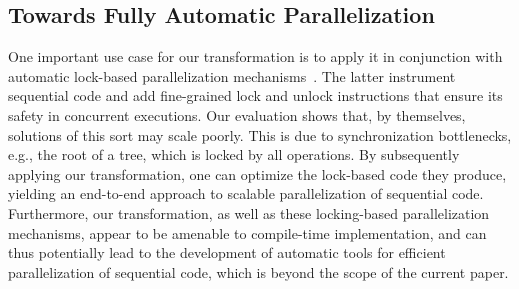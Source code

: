 \subsection{Towards Fully Automatic Parallelization}
One important use case for our transformation is to apply it in conjunction with automatic lock-based
parallelization mechanisms~\cite{Gueta2011,MZGB:POPL06}.
The latter instrument sequential code 
and add fine-grained lock and unlock instructions that ensure its safety in concurrent executions.
Our evaluation shows that, by themselves, solutions of this sort may scale poorly.
This is due to synchronization bottlenecks, e.g., the root of a tree,
which is locked by all operations.
By subsequently applying our transformation, one can optimize
the lock-based code they produce, yielding an end-to-end approach to
scalable parallelization of sequential code.
Furthermore, our transformation, as well as these locking-based parallelization mechanisms, 
appear to be amenable to compile-time implementation, and can thus potentially 
lead to the development of automatic tools for efficient parallelization of sequential code,
which is beyond the scope of the current paper. 


